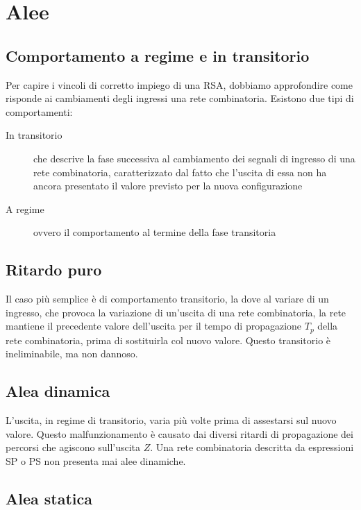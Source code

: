 \documentclass{article}
\begin{document}
\section{Alee}

\subsection{Comportamento a regime e in transitorio}

Per capire i vincoli di corretto impiego di una RSA, dobbiamo approfondire come risponde ai cambiamenti degli ingressi una rete combinatoria.
Esistono due tipi di comportamenti:

\begin{description}
    \item[In transitorio] che descrive la fase successiva al cambiamento dei segnali di ingresso di una rete combinatoria, caratterizzato dal fatto che l'uscita di essa non ha ancora presentato il valore previsto per la nuova configurazione
    \item[A regime] ovvero il comportamento al termine della fase transitoria
\end{description}

\subsection{Ritardo puro}

Il caso più semplice è di comportamento transitorio, la dove al variare di un ingresso, che provoca la variazione di un'uscita di una rete combinatoria, la rete mantiene il precedente valore dell'uscita per il tempo di propagazione $T_p$ della rete combinatoria, prima di sostituirla col nuovo valore.
Questo transitorio è ineliminabile, ma non dannoso.

\subsection{Alea dinamica}

L'uscita, in regime di transitorio, varia più volte prima di assestarsi sul nuovo valore.
Questo malfunzionamento è causato dai diversi ritardi di propagazione dei percorsi che agiscono sull'uscita $Z$.
Una rete combinatoria descritta da espressioni SP o PS non presenta mai alee dinamiche.

\subsection{Alea statica}
\end{document}
